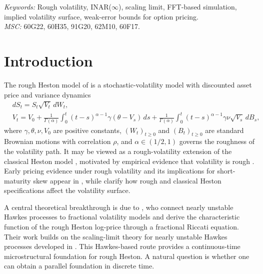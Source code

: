 \documentclass[letterpaper]{article}
\numberwithin{equation}{section}
\theoremstyle{definition}
\theoremstyle{remark}
\begin{document}
\noindent%
{\it Keywords:} Rough volatility, INAR($\infty$), scaling limit, FFT-based simulation, implied volatility surface, weak-error bounds for option pricing.\\

\noindent%
{\it MSC:}  60G22, 60H35, 91G20, 62M10, 60F17.

\vfill




\section{Introduction}

The rough Heston model of \cite{el2019characteristic} is a stochastic-volatility model with discounted asset price and variance dynamics
\begin{align*}
&dS_t = S_t\sqrt{V_t}\,dW_t,
\\
&V_t = V_0 + \frac{1}{\Gamma(\alpha)}\int_0^t (t-s)^{\alpha-1}\gamma(\theta - V_s)\,ds
      + \frac{1}{\Gamma(\alpha)}\int_0^t (t-s)^{\alpha-1}\gamma\nu \sqrt{V_s}\,dB_s,
\end{align*}
where $\gamma,\theta,\nu,V_0$ are positive constants, $(W_{t})_{t\geq 0}$ and $(B_{t})_{t\geq 0}$ are standard Brownian motions with correlation $\rho$, and $\alpha\in(1/2,1)$ governs the roughness of the volatility path. It may be viewed as a rough-volatility extension of the classical Heston model \cite{heston1993closed}, motivated by empirical evidence that volatility is rough \cite{gatheral2018volatility}. Early pricing evidence under rough volatility and its implications for short-maturity skew appear in \cite{BayerFrizGatheral2015PricingRough}, while \cite{KellerResselMajid2020Comparison} clarify how rough and classical Heston specifications affect the volatility surface.

A central theoretical breakthrough is due to \cite{el2019characteristic}, who connect nearly unstable Hawkes processes to fractional volatility models and derive the characteristic function of the rough Heston log-price through a fractional Riccati equation. Their work builds on the scaling-limit theory for nearly unstable Hawkes processes developed in \cite{jaisson2015limit,jaisson2016rough}. This Hawkes-based route provides a continuous-time microstructural foundation for rough Heston. A natural question is whether one can obtain a parallel foundation in discrete time.
\end{document}
